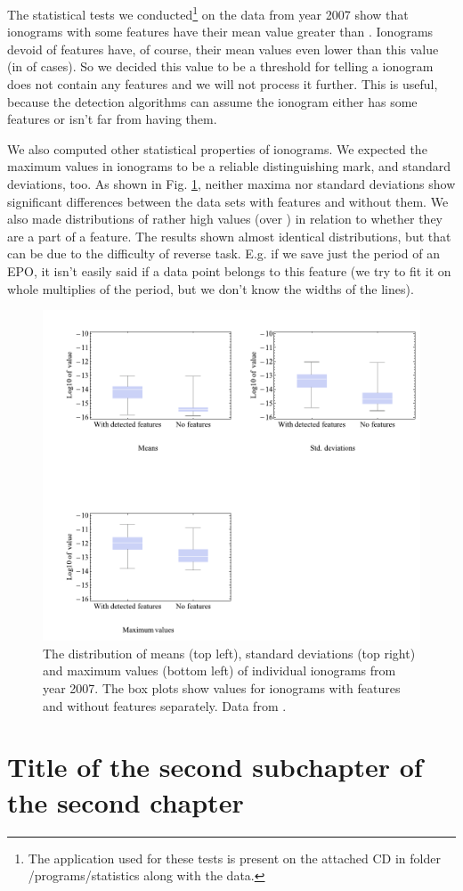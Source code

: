 The statistical tests we conducted\footnote{The application used for these tests is present on the attached CD in folder /programs/statistics along with the data.} on the data from year 2007 show that  ionograms with some features have their mean value greater than . Ionograms devoid of features have, of course, their mean values even lower than this value (in  of cases). So we decided this value to be a threshold for telling a ionogram does not contain any features and we will not process it further. This is useful, because the detection algorithms can assume the ionogram either has some features or isn't far from having them.

We also computed other statistical properties of ionograms. We expected the maximum values in ionograms to be a reliable distinguishing mark, and standard deviations, too. As shown in Fig. \ref{fig:data_stats}, neither maxima nor standard deviations show significant differences between the data sets with features and without them. We also made distributions of rather high values (over ) in relation to whether they are a part of a feature. The results shown almost identical distributions, but that can be due to the difficulty of reverse task. E.g. if we save just the period of an EPO, it isn't easily said if a data point belongs to this feature (we try to fit it on whole multiplies of the period, but we don't know the widths of the lines). 

\begin{figure}
	\centering
	\includegraphics[width=140mm]{images/data_stats.pdf}
	\caption{The distribution of means (top left), standard deviations (top right) and maximum values (bottom left) of individual ionograms from year 2007. The box plots show values for ionograms with features and without features separately. Data from \citep{FTP}.}
	\label{fig:data_stats}
\end{figure}


\section{Title of the second subchapter of the second chapter}
